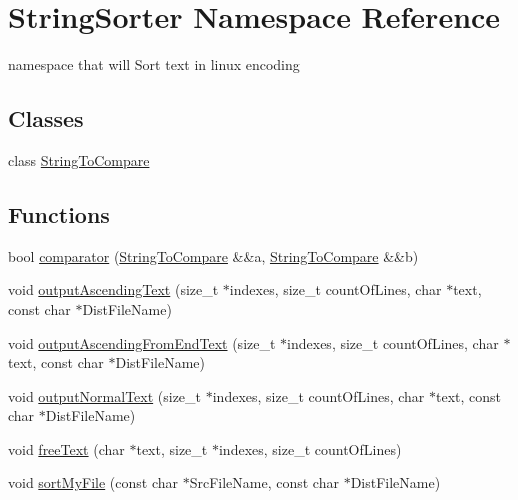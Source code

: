 \hypertarget{namespaceStringSorter}{}\section{String\+Sorter Namespace Reference}
\label{namespaceStringSorter}


namespace that will Sort text in linux encoding  


\subsection*{Classes}
\begin{DoxyCompactItemize}
\item 
class \hyperlink{classStringSorter_1_1StringToCompare}{String\+To\+Compare}
\end{DoxyCompactItemize}
\subsection*{Functions}
\begin{DoxyCompactItemize}
\item 
bool \hyperlink{namespaceStringSorter_aaec9bf5e9700c12c60a776b1bfa1482a}{comparator} (\hyperlink{classStringSorter_1_1StringToCompare}{String\+To\+Compare} \&\&a, \hyperlink{classStringSorter_1_1StringToCompare}{String\+To\+Compare} \&\&b)
\item 
void \hyperlink{namespaceStringSorter_ab2f956c17f58db55a6c1b3cc48e26108}{output\+Ascending\+Text} (size\+\_\+t $\ast$indexes, size\+\_\+t count\+Of\+Lines, char $\ast$text, const char $\ast$Dist\+File\+Name)
\item 
void \hyperlink{namespaceStringSorter_a29f196a9200efe143fd5836b2178b082}{output\+Ascending\+From\+End\+Text} (size\+\_\+t $\ast$indexes, size\+\_\+t count\+Of\+Lines, char $\ast$text, const char $\ast$Dist\+File\+Name)
\item 
void \hyperlink{namespaceStringSorter_a76e27d59dd08d57f6fd178a52d124421}{output\+Normal\+Text} (size\+\_\+t $\ast$indexes, size\+\_\+t count\+Of\+Lines, char $\ast$text, const char $\ast$Dist\+File\+Name)
\item 
void \hyperlink{namespaceStringSorter_a49226981ae6a4fcc57865d9e2ba82d76}{free\+Text} (char $\ast$text, size\+\_\+t $\ast$indexes, size\+\_\+t count\+Of\+Lines)
\item 
void \hyperlink{namespaceStringSorter_a16b92b697d5f8640ad8ba629d0b1afc3}{sort\+My\+File} (const char $\ast$Src\+File\+Name, const char $\ast$Dist\+File\+Name)
\end{DoxyCompactItemize}


